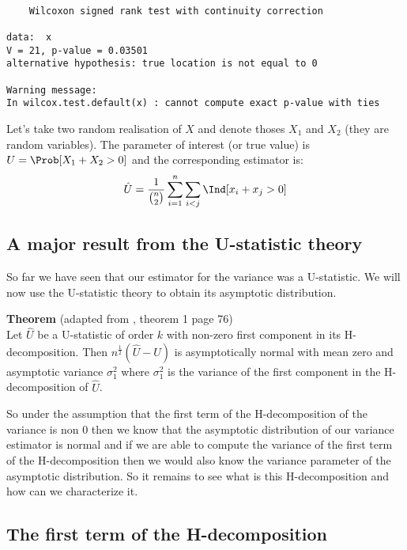 \documentclass[12pt]{article}
\begin{document}
\begin{verbatim}

	Wilcoxon signed rank test with continuity correction

data:  x
V = 21, p-value = 0.03501
alternative hypothesis: true location is not equal to 0

Warning message:
In wilcox.test.default(x) : cannot compute exact p-value with ties
\end{verbatim}

Let's take two random realisation of \(X\) and denote thoses \(X_1\)
and \(X_2\) (they are random variables). The parameter of interest (or
true value) is \(U = \Prob[X_1+X_2>0]\) and the corresponding
estimator is:
\begin{align*}
\hat{U} = \frac{1}{{n \choose 2}} \sum_{i=1}^{n} \sum_{i<j} \Ind[x_i+x_j>0]
\end{align*}

\subsection{A major result from the U-statistic theory}
\label{sec:org04fe73f}

So far we have seen that our estimator for the variance was a
U-statistic. We will now use the U-statistic theory to obtain its
asymptotic distribution.

\bigskip

\textbf{Theorem} (adapted from \cite{lee1990u}, theorem 1 page 76) \\
 Let \(\hat{U}\) be a U-statistic of order \(k\) with non-zero first
 component in its H-decomposition. Then \(n^{\frac{1}{2}}
 (\hat{U}-U)\) is asymptotically normal with mean zero and asymptotic
 variance \(\sigma^2_1\) where \(\sigma^2_1\) is the variance of the
 first component in the H-decomposition of \(\hat{U}\).

\bigskip

So under the assumption that the first term of the H-decomposition of
the variance is non 0 then we know that the asymptotic distribution of
our variance estimator is normal and if we are able to compute the
variance of the first term of the H-decomposition then we would also
know the variance parameter of the asymptotic distribution. So it
remains to see what is this H-decomposition and how can we
characterize it.

\subsection{The first term of the H-decomposition}
\label{sec:org668a292}
\end{document}
